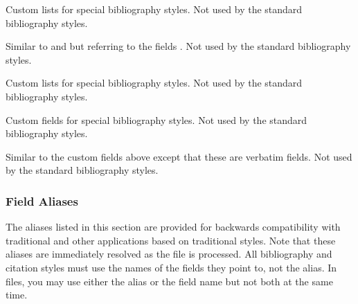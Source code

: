 \documentclass{ltxdockit}[2011/03/25]
\begin{document}
\begin{fieldlist}


Custom lists for special bibliography styles. Not used by the standard bibliography styles.


Similar to  and  but referring to the fields . Not used by the standard bibliography styles.


Custom lists for special bibliography styles. Not used by the standard bibliography styles.


Custom fields for special bibliography styles. Not used by the standard bibliography styles.


Similar to the custom fields above except that these are verbatim fields. Not used by the standard bibliography styles.

\end{fieldlist}

\subsubsection{Field Aliases}
\label{bib:fld:als}

The aliases listed in this section are provided for backwards compatibility with traditional \bibtex and other applications based on traditional \bibtex styles. Note that these aliases are immediately resolved as the  file is processed. All bibliography and citation styles must use the names of the fields they point to, not the alias. In  files, you may use either the alias or the field name but not both at the same time.
\end{document}
